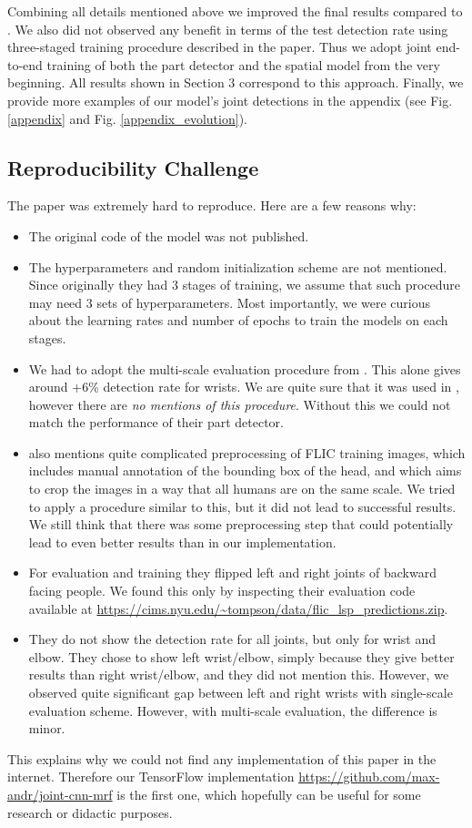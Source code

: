 \documentclass[a4paper,10pt]{article}
\begin{document}
	Combining all details mentioned above we improved the final results compared to \cite{cnn_pgm_for_hpe}. We also did not observed any benefit in terms of the test detection rate using three-staged training procedure described in the paper. Thus we adopt joint end-to-end training of both the part detector and the spatial model from the very beginning. All results shown in Section 3 correspond to this approach. Finally, we provide more examples of our model's joint detections in the appendix (see Fig. \ref{appendix} and Fig. \ref{appendix_evolution}).
	

	\subsection{Reproducibility Challenge}
	The paper \cite{cnn_pgm_for_hpe} was extremely hard to reproduce. Here are a few reasons why:
	\begin{itemize}
		\item The original code of the model was not published.
		\item The hyperparameters and random initialization scheme are not mentioned. Since originally they had 3 stages of training, we assume that such procedure may need 3 sets of hyperparameters. Most importantly, we were curious about the learning rates and number of epochs to train the models on each stages.
		\item We had to adopt the multi-scale evaluation procedure from \cite{prev_iclr_paper}. This alone gives around +6\% detection rate for wrists. We are quite sure that it was used in \cite{cnn_pgm_for_hpe}, however there are \textit{no mentions of this procedure}. Without this we could not match the performance of their part detector.
		\item \cite{prev_iclr_paper} also mentions quite complicated preprocessing of FLIC training images, which includes manual annotation of the bounding box of the head, and which aims to crop the images in a way that all humans are on the same scale. We tried to apply a procedure similar to this, but it did not lead to successful results. We still think that there was some preprocessing step that could potentially lead to even better results than in our implementation.
		\item For evaluation and training they flipped left and right joints of backward facing people. We found this only by inspecting their evaluation code available at \url{https://cims.nyu.edu/~tompson/data/flic_lsp_predictions.zip}.
		\item They do not show the detection rate for all joints, but only for wrist and elbow. They chose to show left wrist/elbow, simply because they give better results than right wrist/elbow, and they did not mention this. However, we observed quite significant gap between left and right wrists with single-scale evaluation scheme. However, with multi-scale evaluation, the difference is minor.
	\end{itemize}
	This explains why we could not find any implementation of this paper in the internet. Therefore our TensorFlow implementation \url{https://github.com/max-andr/joint-cnn-mrf} is the first one, which hopefully can be useful for some research or didactic purposes.
	
\end{document}

